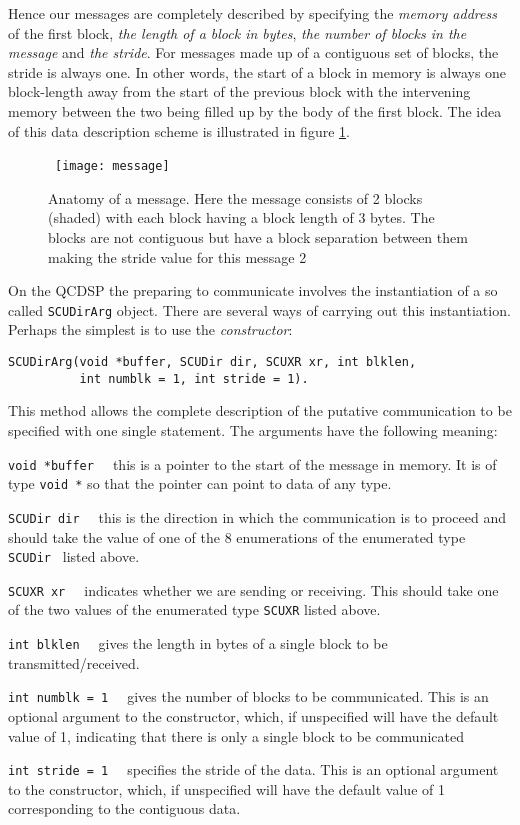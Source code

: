 \begin{itemize}
Hence our messages are completely described by specifying the {\em
memory address} of the first block, {\em the length of a block in
bytes}, {\em the number of blocks in the message} and {\em the
stride}.  For messages made up of a contiguous set of blocks, the
stride is always one. In other words, the start of a block in memory is
always one block-length away from the start of the previous block with the
intervening memory between the two being filled up by the body of
the first block. The idea of this data description scheme is illustrated
in figure \ref{f:message}.
\end{itemize}

\begin{figure}[h]
\begin{center}
\leavevmode
\hbox{
\texttt{[image: message]}}
\end{center}
\caption{Anatomy of a message. Here the message consists of 2 blocks
(shaded) with each block having a block length of 3 bytes. The blocks
are not contiguous but have a block separation between them making the
stride value for this message 2}
\label{f:message}
\end{figure}

On the QCDSP the preparing to communicate involves the instantiation
of a so called {\tt SCUDirArg} object. There are several ways of
carrying out this instantiation. Perhaps the simplest is to use the
{\em constructor}: 
{\small \begin{verbatim} 
SCUDirArg(void *buffer, SCUDir dir, SCUXR xr, int blklen, 
          int numblk = 1, int stride = 1).
\end{verbatim}}
This method allows the complete description of the putative communication to be specified with one single statement. The arguments have the following meaning:
\begin{description}
\item{\tt void *buffer \ } 
this is a pointer to the start of the message in memory. It is of type {\tt void *} so that the pointer can point to data of any type. 
\item{\tt SCUDir dir \ } 
this is the direction in which the communication is to proceed and should take
the value of one of the 8 enumerations of the enumerated type {\tt SCUDir } listed above.
\item{\tt SCUXR xr \ } 
indicates whether we are sending or receiving. This should take one of the two 
values of the enumerated type {\tt SCUXR} listed above.
\item{\tt int blklen \ } 
gives the length in bytes of a single block to be transmitted/received.
\item{\tt int numblk = 1 \ }
gives the number of blocks to be communicated. This is an optional
argument to the constructor, which, if unspecified will have the
default value of 1, indicating that there is only a single block to be
communicated
\item{\tt int stride = 1 \ }
specifies the stride of the data. This is an optional argument to the constructor, which, if unspecified will have the default value of 1 corresponding to the 
contiguous data.
\end{description}

